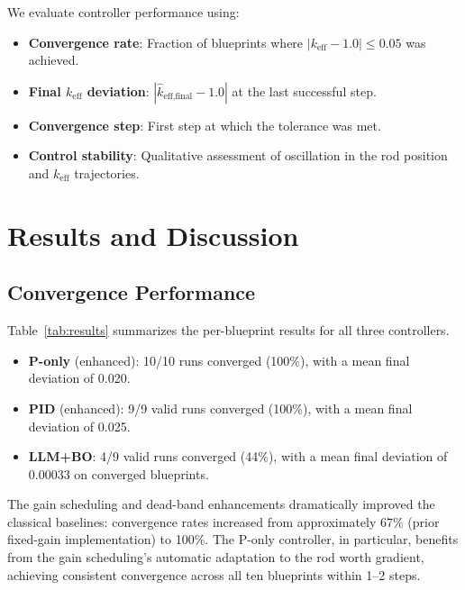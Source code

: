 \documentclass[11pt,twocolumn]{article}
\begin{document}
We evaluate controller performance using:
\begin{itemize}
    \item \textbf{Convergence rate}: Fraction of blueprints where $|k_\text{eff} - 1.0| \leq 0.05$ was achieved.
    \item \textbf{Final $k_\text{eff}$ deviation}: $|\hat{k}_\text{eff,final} - 1.0|$ at the last successful step.
    \item \textbf{Convergence step}: First step at which the tolerance was met.
    \item \textbf{Control stability}: Qualitative assessment of oscillation in the rod position and $k_\text{eff}$ trajectories.
\end{itemize}

\section{Results and Discussion}
\label{sec:results}

\subsection{Convergence Performance}

Table~\ref{tab:results} summarizes the per-blueprint results for all three controllers.

\begin{itemize}
    \item \textbf{P-only} (enhanced): 10/10 runs converged (100\%), with a mean final deviation of 0.020.
    \item \textbf{PID} (enhanced): 9/9 valid runs converged (100\%), with a mean final deviation of 0.025.
    \item \textbf{LLM+BO}: 4/9 valid runs converged (44\%), with a mean final deviation of 0.00033 on converged blueprints.
\end{itemize}

The gain scheduling and dead-band enhancements dramatically improved the classical baselines: convergence rates increased from approximately 67\% (prior fixed-gain implementation) to 100\%.
The P-only controller, in particular, benefits from the gain scheduling's automatic adaptation to the rod worth gradient, achieving consistent convergence across all ten blueprints within 1--2 steps.
\end{document}
